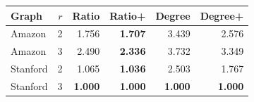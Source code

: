 \begin{tabular}{@{}lrrrrr@{}}
\toprule
Graph & $r$ & Ratio & Ratio+ & Degree & Degree+ \\
\midrule
Amazon & 2 & 1.756 & \textbf{1.707} & 3.439 & 2.576 \\
Amazon & 3 & 2.490 & \textbf{2.336} & 3.732 & 3.349 \\
Stanford & 2 & 1.065 & \textbf{1.036} & 2.503 & 1.767 \\
Stanford & 3 & \textbf{1.000} & \textbf{1.000} & \textbf{1.000} & \textbf{1.000} \\
\bottomrule
\end{tabular}

